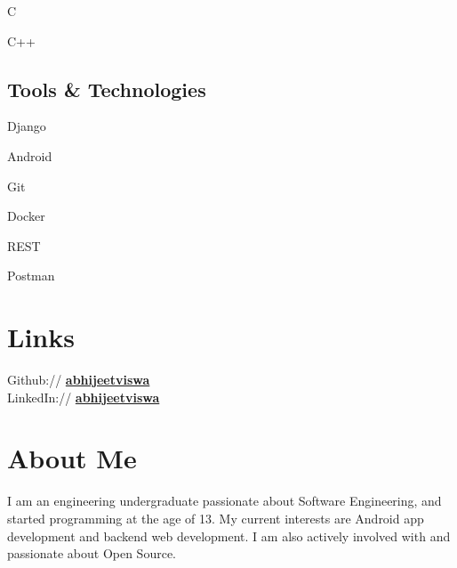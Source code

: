\documentclass[]{abhijeet_viswa-deedy-resume-openfont}
\begin{document}
\begin{minipage}[t]{0.25\textwidth}
\begin{itemize*}
 \item C
 \item C++
\end{itemize*}
\subsectionsep

\subsection{Tools \& Technologies}
\begin{itemize*}
 \item Django
 \item Android
 \item Git
 \item Docker
 \item REST
 \item Postman
\end{itemize*}
\secondarysectionsep

\section{Links}
Github:// \mbox{\href{https://github.com/abhijeetviswa}{\bf abhijeetviswa}}\\[3pt]
LinkedIn://  \mbox{\href{https://www.linkedin.com/in/abhijeetviswa}{\bf abhijeetviswa}} \\
\secondarysectionsep


\section{About Me}
\noindent \RaggedRight \normalfont
I am an engineering undergraduate passionate about Software Engineering, and started
programming at the age of 13. My current interests are Android app development and
backend web development. I am also actively involved with and passionate about Open Source.

%
%

\end{minipage}
\end{document}
